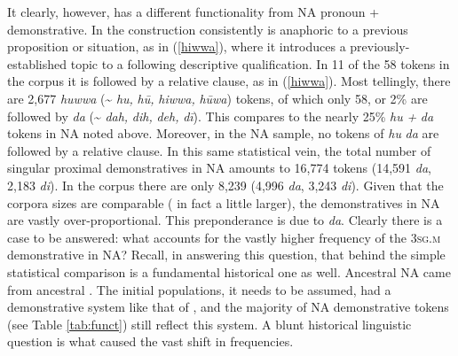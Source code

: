 \documentclass[output=paper]{langsci/langscibook}
\begin{document}
It clearly, however, has a different functionality from NA pronoun + demonstrative. In  the construction consistently is anaphoric to a previous proposition or situation, as in (\ref{hiwwa}), where it introduces a previously-established topic to a following descriptive qualification. In 11 of the 58 tokens in the  corpus it is followed by a {relative} clause, as in (\ref{hiwwa}). Most tellingly, there are 2,677 \textit{huwwa} ({\textasciitilde} \textit{hu,} \textit{hū,} \textit{hiwwa,} \textit{hūwa}) tokens, of which only 58, or 2\% are followed by \textit{da} ({\textasciitilde} \textit{dah,} \textit{dih,} \textit{deh,} \textit{dī}). This compares to the nearly 25\% \textit{hu} \textit{+} \textit{da} tokens in NA noted above. Moreover, in the NA sample, no tokens of \textit{hu} \textit{da} are followed by a {relative} clause. In this same statistical vein, the total number of singular proximal {demonstratives} in NA amounts to 16,774 tokens (14,591 \textit{da}, 2,183 \textit{di}). In the  corpus there are only 8,239 (4,996 \textit{da}, 3,243 \textit{di}). Given that the corpora sizes are comparable ( in fact a little larger), the {demonstratives} in NA are vastly over-proportional. This preponderance is due to \textit{da}. Clearly there is a case to be answered: what accounts for the vastly higher {frequency} of the 3\textsc{sg.m} demonstrative in NA? Recall, in answering this question, that behind the simple statistical comparison is a fundamental historical one as well. Ancestral NA came from ancestral . The initial populations, it needs to be assumed, had a demonstrative system like that of , and the majority of NA demonstrative tokens (see Table \ref{tab:funct}) still reflect this system. A blunt historical linguistic question is what caused the vast shift in frequencies.
\end{document}

